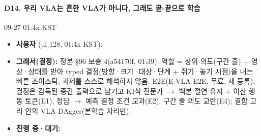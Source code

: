 \paragraph{D14. 우리 VLA는 흔한 VLA가 아니다, 그래도 끝-끝으로 학습}
{\small 09-27 01:4x KST}
\begin{itemize}
  \item \textbf{사용자} (ul 128, 01:4x KST): 
  \item \textbf{그래서(결정):} 정본 §96 보충 4(a54170f, 01:39): 역할 = 상위 의도(구간 줄) + 영상·상태를 받아 typed 결정(방향·크기·대상·단계 + 쥐기·놓기 시점)을 내는 빠른 조이스틱, 과제를 스스로 해석하지 않음. E2E(E-VLA-E2E, 무료, 새 등록): 결정은 감독된 중간 출력으로 남기고 KI식 전문가 $\rightarrow$ 백본 절연 유지 + 이산 행동 토큰(E1), 정답 $\rightarrow$ 예측 결정 조건 교과(E2), 구간 줄 의도 교란(E4); 결합 고리 안의 VLA DAgger(본학습 자리만).
  \item \textbf{진행 중·대기:} 
\end{itemize}
